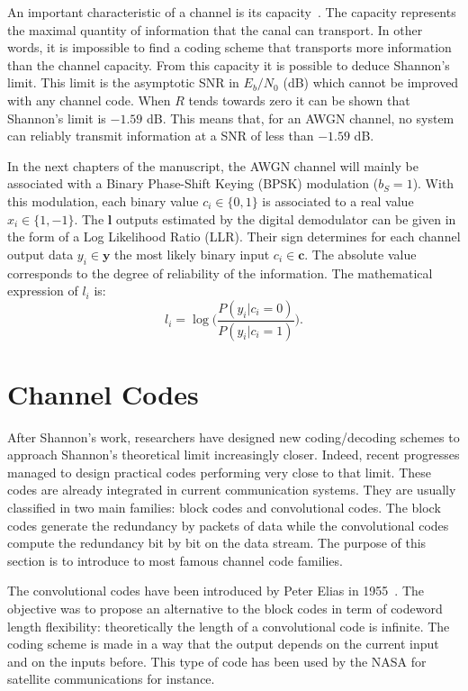 An important characteristic of a channel is its capacity~\cite{Shannon1948}. The
capacity represents the maximal quantity of information that the canal can
transport. In other words, it is impossible to find a coding scheme that
transports more information than the channel capacity. From this capacity it is
possible to deduce Shannon's limit. This limit is the asymptotic SNR in
$E_b/N_0$ (dB) which cannot be improved with any channel code. When $R$ tends
towards zero it can be shown that Shannon's limit is $-1.59$ dB. This means
that, for an AWGN channel, no system can reliably transmit information at a SNR
of less than $-1.59$ dB.

In the next chapters of the manuscript, the AWGN channel will mainly be
associated with a Binary Phase-Shift Keying (BPSK) modulation ($b_S = 1$). With
this modulation, each binary value $c_i \in \{0,1\}$ is associated to a real
value $x_i \in \{1,-1\}.$ The $\bm{l}$ outputs estimated by the digital
demodulator can be given in the form of a Log Likelihood Ratio (LLR). Their sign
determines for each channel output data $y_i \in \bm{y}$ the most likely binary
input $c_i \in \bm{c}$. The absolute value corresponds to the degree of
reliability of the information. The mathematical expression of $l_i$ is:
\begin{equation*}
l_i = \log{\Big(\frac{P(y_i|c_i = 0)}{P(y_i|c_i = 1)}\Big)}.
\end{equation*}

\section{Channel Codes}

After Shannon's work, researchers have designed new coding/decoding schemes to
approach Shannon's theoretical limit increasingly closer. Indeed, recent
progresses managed to design practical codes performing very close to that
limit. These codes are already integrated in current communication systems. They
are usually classified in two main families: block codes and convolutional
codes. The block codes generate the redundancy by packets of data while the
convolutional codes compute the redundancy bit by bit on the data stream. The
purpose of this section is to introduce to most famous channel code families.

The convolutional codes have been introduced by Peter Elias in
1955~\cite{Elias1955}. The objective was to propose an alternative to the block
codes in term of codeword length flexibility: theoretically the length of a
convolutional code is infinite. The coding scheme is made in a way that the
output depends on the current input and on the inputs before. This type of code
has been used by the NASA for satellite communications for instance.

